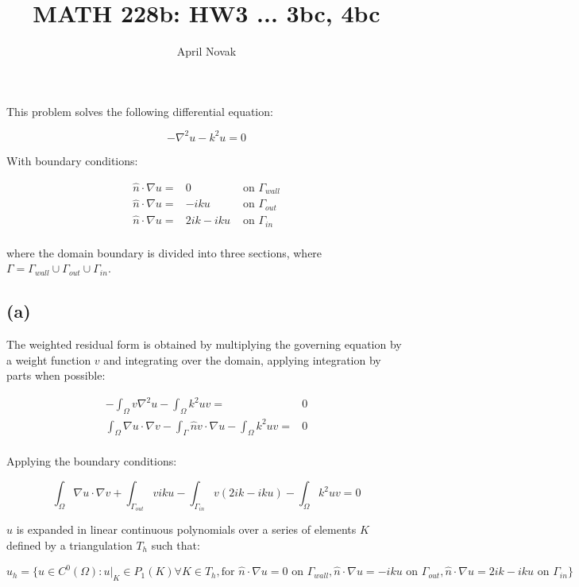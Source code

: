 \documentclass[10pt]{article}
\newcommand{\beq}{\begin{equation}}
\newcommand{\eeq}{\end{equation}}
\newcommand{\beqa}{\begin{equation}\begin{aligned}}
\newcommand{\eeqa}{\end{aligned}\end{equation}}
\begin{document}
\title{MATH 228b: HW3 ... 3bc, 4bc}
\author{April Novak}

\maketitle

\section{}

This problem solves the following differential equation:

\beq
\label{eq:prob}
-\nabla^2 u-k^2u=0
\eeq

With boundary conditions:

\beqa
\label{eq:BCs}
\hat{n}\cdot\nabla u=&0 & \textrm{ on } \Gamma_{wall}\\
\hat{n}\cdot\nabla u=&-iku & \textrm{ on } \Gamma_{out}\\
\hat{n}\cdot\nabla u=&2ik-iku & \textrm{ on } \Gamma_{in}\\
\eeqa

where the domain boundary is divided into three sections, where \(\Gamma=\Gamma_{wall}\cup\Gamma_{out}\cup\Gamma_{in}\). 

\subsection{(a)}

The weighted residual form is obtained by multiplying the governing equation by a weight function \(v\) and integrating over the domain, applying integration by parts when possible:

\beqa
-\int_{\Omega}v\nabla^2 u-\int_{\Omega}k^2uv=& 0\\
\int_{\Omega}\nabla u\cdot\nabla v-\int_{\Gamma}\hat{n}v\cdot\nabla u-\int_{\Omega}k^2uv=&0\\
\eeqa

Applying the boundary conditions:

\beq
\int_{\Omega}\nabla u\cdot\nabla v+\int_{\Gamma_{out}}viku-\int_{\Gamma_{in}}v(2ik-iku)-\int_{\Omega}k^2uv=0
\eeq

\(u\) is expanded in linear continuous polynomials over a series of elements \(K\) defined by a triangulation \(T_h\) such that:

\beq
u_h=\{u\in C^0(\Omega):u\rvert_K\in P_1(K)\forall K\in T_h, \textrm{for } \hat{n}\cdot\nabla u=0 \textrm{ on } \Gamma_{wall}, \hat{n}\cdot\nabla u=-iku \textrm{ on } \Gamma_{out}, \hat{n}\cdot\nabla u=2ik-iku \textrm{ on } \Gamma_{in}\}
\eeq
\end{document}
